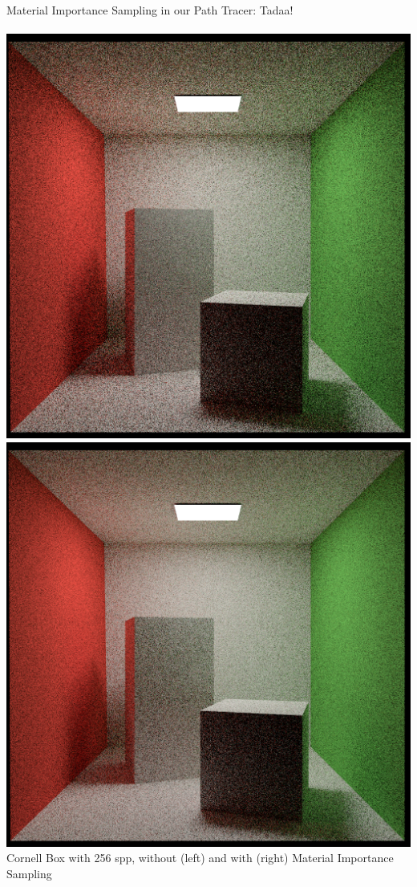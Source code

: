 \documentclass[utf8,stillsansserifmath,fleqn,t]{beamer}
\begin{document}
\begin{frame}[label=material-importance-sampling-2]
\frametitle{\insertsection}
Material Importance Sampling in our Path Tracer: Tadaa!\\~\\
\includegraphics[width=.48\textwidth]{./fig/pathtracer-result-08-1.png}\hfill
\includegraphics[width=.48\textwidth]{./fig/pathtracer-result-09-1.png}\\
Cornell Box with 256 spp, without (left) and with (right) Material Importance Sampling
\end{frame}
\end{document}
